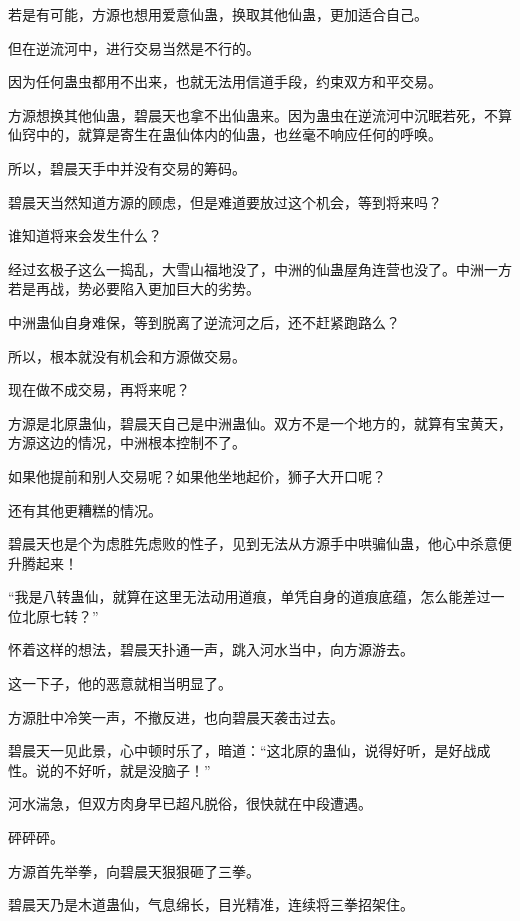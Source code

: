 
\begin{this_body}



若是有可能，方源也想用爱意仙蛊，换取其他仙蛊，更加适合自己。

但在逆流河中，进行交易当然是不行的。

因为任何蛊虫都用不出来，也就无法用信道手段，约束双方和平交易。

方源想换其他仙蛊，碧晨天也拿不出仙蛊来。因为蛊虫在逆流河中沉眠若死，不算仙窍中的，就算是寄生在蛊仙体内的仙蛊，也丝毫不响应任何的呼唤。

所以，碧晨天手中并没有交易的筹码。

碧晨天当然知道方源的顾虑，但是难道要放过这个机会，等到将来吗？

谁知道将来会发生什么？

经过玄极子这么一捣乱，大雪山福地没了，中洲的仙蛊屋角连营也没了。中洲一方若是再战，势必要陷入更加巨大的劣势。

中洲蛊仙自身难保，等到脱离了逆流河之后，还不赶紧跑路么？

所以，根本就没有机会和方源做交易。

现在做不成交易，再将来呢？

方源是北原蛊仙，碧晨天自己是中洲蛊仙。双方不是一个地方的，就算有宝黄天，方源这边的情况，中洲根本控制不了。

如果他提前和别人交易呢？如果他坐地起价，狮子大开口呢？

还有其他更糟糕的情况。

碧晨天也是个为虑胜先虑败的性子，见到无法从方源手中哄骗仙蛊，他心中杀意便升腾起来！

“我是八转蛊仙，就算在这里无法动用道痕，单凭自身的道痕底蕴，怎么能差过一位北原七转？”

怀着这样的想法，碧晨天扑通一声，跳入河水当中，向方源游去。

这一下子，他的恶意就相当明显了。

方源肚中冷笑一声，不撤反进，也向碧晨天袭击过去。

碧晨天一见此景，心中顿时乐了，暗道：“这北原的蛊仙，说得好听，是好战成性。说的不好听，就是没脑子！”

河水湍急，但双方肉身早已超凡脱俗，很快就在中段遭遇。

砰砰砰。

方源首先举拳，向碧晨天狠狠砸了三拳。

碧晨天乃是木道蛊仙，气息绵长，目光精准，连续将三拳招架住。


\end{this_body}
